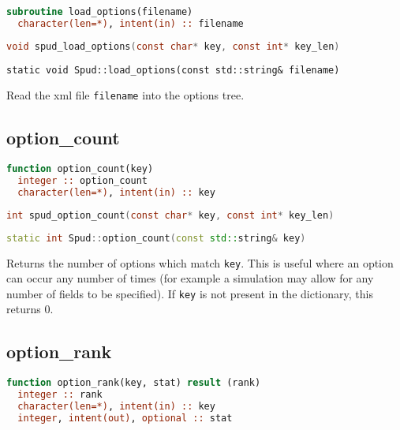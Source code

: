 \documentclass[a4paper, 11pt]{book}
\begin{document}
\begin{lstlisting}[language=fortran]
subroutine load_options(filename) 
  character(len=*), intent(in) :: filename
\end{lstlisting}

\begin{lstlisting}[language=C]
void spud_load_options(const char* key, const int* key_len)
\end{lstlisting}

\begin{lstlisting}
static void Spud::load_options(const std::string& filename)
\end{lstlisting}

Read the xml file \lstinline+filename+ into the options tree.

\subsection{option\_count}

\begin{lstlisting}[language=fortran]
function option_count(key)
  integer :: option_count
  character(len=*), intent(in) :: key
\end{lstlisting}

\begin{lstlisting}[language=C]
int spud_option_count(const char* key, const int* key_len)
\end{lstlisting}

\begin{lstlisting}[language=C++]
static int Spud::option_count(const std::string& key)
\end{lstlisting}

Returns the number of options which match \lstinline+key+. This is
useful where an option can occur any number of times (for example a
simulation may allow for any number of fields to be specified). If
\lstinline+key+ is not present in the dictionary, this returns 0.

\subsection{option\_rank}

\begin{lstlisting}[language=fortran]
function option_rank(key, stat) result (rank)
  integer :: rank
  character(len=*), intent(in) :: key
  integer, intent(out), optional :: stat
\end{lstlisting}
\end{document}
